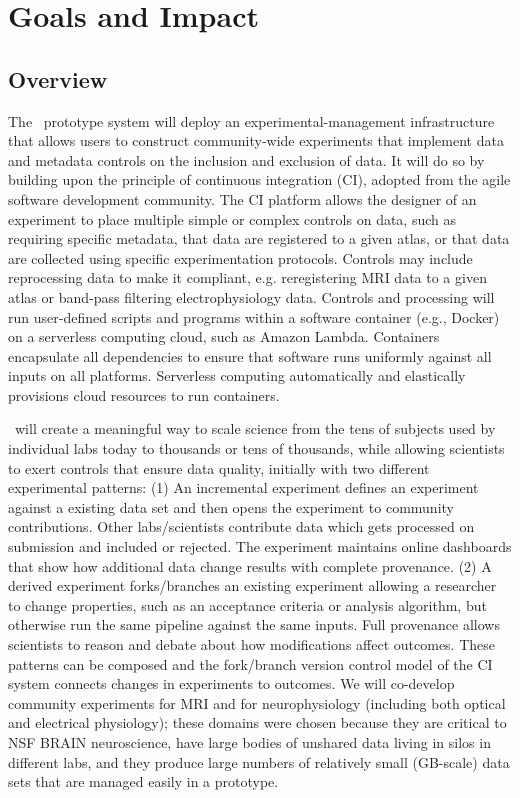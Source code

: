 \section{Goals and  Impact}

\subsection{Overview}
%
The \name~prototype system will deploy an experimental-management infrastructure that allows users to construct community-wide experiments that implement data and metadata controls on the inclusion and exclusion of data. It will do so by building upon the principle of continuous integration (CI), adopted from the agile software development community. The CI platform allows the designer of an experiment to place multiple simple or complex controls on data, such as requiring specific metadata, that data are registered to a given atlas, or that data are collected using specific experimentation protocols. Controls may include reprocessing data to make it compliant, e.g. reregistering MRI data to a given atlas or band-pass filtering electrophysiology data. Controls and processing will run user-defined scripts and programs within a software container (e.g., Docker) on a serverless computing cloud, such as Amazon Lambda. Containers encapsulate all dependencies to ensure that software runs uniformly against all inputs on all platforms. Serverless computing automatically and elastically provisions cloud resources to run containers.

\name~will create a meaningful way to scale science from the tens of subjects used by individual labs today to thousands or tens of thousands, while allowing scientists to exert controls that ensure data quality, initially with two different experimental patterns: (1) An incremental experiment defines an experiment against a existing data set and then opens the experiment to community contributions. Other labs/scientists contribute data which gets processed on submission and included or rejected. The experiment maintains online dashboards that show how additional data change results with complete provenance. (2) A derived experiment forks/branches an existing experiment allowing a researcher to change properties, such as an acceptance criteria or analysis algorithm, but otherwise run the same pipeline against the same inputs. Full provenance allows scientists to reason and debate about how modifications affect outcomes. These patterns can be composed and the fork/branch version control model of the CI system connects changes in experiments to outcomes. We will co-develop community experiments for MRI and for neurophysiology (including both optical and electrical physiology); these domains were chosen because they are critical to NSF BRAIN neuroscience, have large bodies of unshared data living in silos in different labs, and they produce large numbers of relatively small (GB-scale) data sets that are managed easily in a prototype.

